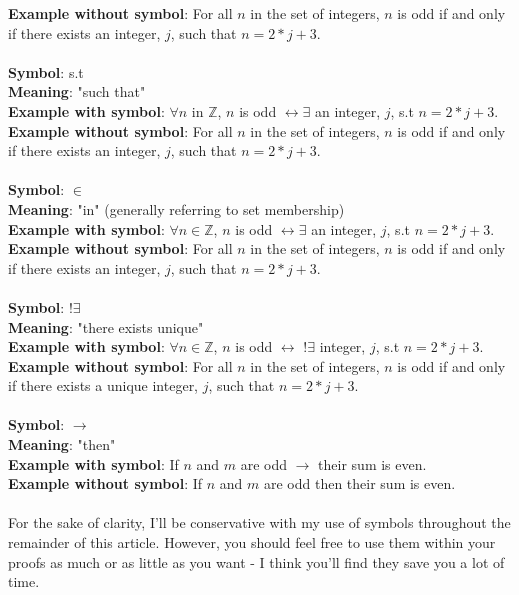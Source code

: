\documentclass[a4paper,12pt]{article}
\begin{document}
\textbf{Example without symbol}: For all $n$ in the set of integers, $n$ is odd if and only if there exists an integer, $j$, such that $n = 2*j + 3$.\\ 
\\
\textbf{Symbol}: s.t\\
\textbf{Meaning}: "such that"\\
\textbf{Example with symbol}: $\forall n$ in $\mathbb{Z}$, $n$ is odd $\leftrightarrow  \exists$ an integer, $j$, s.t $n = 2*j + 3$.\\
\textbf{Example without symbol}: For all $n$ in the set of integers, $n$ is odd if and only if there exists an integer, $j$, such that $n = 2*j + 3$.\\ 
\\
\textbf{Symbol}: $\in$\\
\textbf{Meaning}: "in" (generally referring to set membership)\\
\textbf{Example with symbol}: $\forall n \in \mathbb{Z}$, $n$ is odd $\leftrightarrow  \exists$ an integer, $j$, s.t $n = 2*j + 3$.\\
\textbf{Example without symbol}: For all $n$ in the set of integers, $n$ is odd if and only if there exists an integer, $j$, such that $n = 2*j + 3$.\\ 
\\
\textbf{Symbol}: $!\exists$\\
\textbf{Meaning}: "there exists unique"\\
\textbf{Example with symbol}: $\forall n \in \mathbb{Z}$, $n$ is odd $\leftrightarrow$ $!\exists$ integer, $j$, s.t $n = 2*j + 3$.\\
\textbf{Example without symbol}: For all $n$ in the set of integers, $n$ is odd if and only if there exists a unique integer, $j$, such that $n = 2*j + 3$.\\ 
\\
\textbf{Symbol}: $\rightarrow$\\
\textbf{Meaning}: "then"\\
\textbf{Example with symbol}: If $n$ and $m$ are odd $\rightarrow$ their sum is even.\\
\textbf{Example without symbol}: If $n$ and $m$ are odd then their sum is even.\\
\\
For the sake of clarity, I'll be conservative with my use of symbols throughout the remainder of this article. However, you should feel free to use them within your proofs as much or as little as you want - I think you'll find they save you a lot of time.
 
\end{document}
